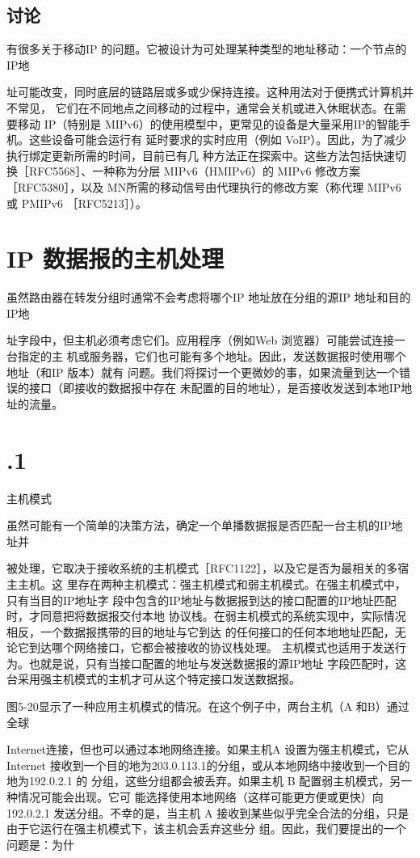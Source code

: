\subsection{讨论}
有很多关于移动IP 的问题。它被设计为可处理某种类型的地址移动：一个节点的IP地

址可能改变，同时底层的链路层或多或少保持连接。这种用法对于便携式计算机并不常见，
它们在不同地点之间移动的过程中，通常会关机或进入休眠状态。在需要移动 IP（特别是
MIPv6）的使用模型中，更常见的设备是大量采用IP的智能手机。这些设备可能会运行有
延时要求的实时应用（例如 VoIP）。因此，为了减少执行绑定更新所需的时间，目前已有几
种方法正在探索中。这些方法包括快速切换［RFC5568］、一种称为分层 MIPv6（HMIPv6）的
MIPv6 修改方案［RFC5380］，以及 MN所需的移动信号由代理执行的修改方案（称代理
MIPv6 或 PMIPv6 ［RFC5213］）。

\section{IP 数据报的主机处理}
虽然路由器在转发分组时通常不会考虑将哪个IP 地址放在分组的源IP 地址和目的IP地

址字段中，但主机必须考虑它们。应用程序（例如Web 浏览器）可能尝试连接一台指定的主
机或服务器，它们也可能有多个地址。因此，发送数据报时使用哪个地址（和IP 版本）就有
问题。我们将探讨一个更微妙的事，如果流量到达一个错误的接口（即接收的数据报中存在
未配置的目的地址），是否接收发送到本地IP地址的流量。

\section{.1}
主机模式

虽然可能有一个简单的决策方法，确定一个单播数据报是否匹配一台主机的IP地址并

被处理，它取决于接收系统的主机模式［RFC1122］，以及它是否为最相关的多宿主主机。这
里存在两种主机模式：强主机模式和弱主机模式。在强主机模式中，只有当目的IP地址字
段中包含的IP地址与数据报到达的接口配置的IP地址匹配时，才同意把将数据报交付本地
协议栈。在弱主机模式的系统实现中，实际情况相反，一个数据报携带的目的地址与它到达
的任何接口的任何本地地址匹配，无论它到达哪个网络接口，它都会被接收的协议栈处理。
主机模式也适用于发送行为。也就是说，只有当接口配置的地址与发送数据报的源IP地址
字段匹配时，这台采用强主机模式的主机才可从这个特定接口发送数据报。

图5-20显示了一种应用主机模式的情况。在这个例子中，两台主机（A 和B）通过全球

Internet连接，但也可以通过本地网络连接。如果主机A 设置为强主机模式，它从 Internet
接收到一个目的地为203.0.113.1的分组，或从本地网络中接收到一个目的地为192.0.2.1 的
分组，这些分组都会被丢弃。如果主机 B 配置弱主机模式，另一种情况可能会出现。它可
能选择使用本地网络（这样可能更方便或更快）向192.0.2.1 发送分组。不幸的是，当主机 A
接收到某些似乎完全合法的分组，只是由于它运行在强主机模式下，该主机会丢弃这些分
组。因此，我们要提出的一个问题是：为什

